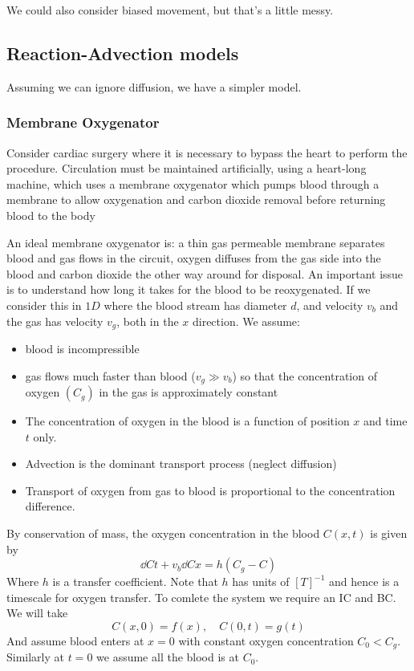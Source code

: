 \documentclass{X:/Documents/Coding/Latex/myassignment}
\begin{document}
We could also consider biased movement, but that's a little messy.

\subsection{Reaction-Advection models}
Assuming we can ignore diffusion, we have a simpler model.
\subsubsection{Membrane Oxygenator}
Consider cardiac surgery where it is necessary to bypass the heart to perform the procedure. Circulation must be maintained artificially, using a heart-long machine, which uses a membrane oxygenator which pumps blood through a membrane to allow oxygenation and carbon dioxide removal before returning blood to the body

An ideal membrane oxygenator is: a thin gas permeable membrane separates blood and gas flows in the circuit, oxygen diffuses from the gas side into the blood and carbon dioxide the other way around for disposal. An important issue is to understand how long it takes for the blood to be reoxygenated. 
If we consider this in $1D$ where the blood stream has diameter $d$, and velocity $v_b$ and the gas has velocity $v_g$, both in the $x$ direction.
We assume:
\begin{itemize}
	\item blood is incompressible
	\item gas flows much faster than blood ($v_g \gg v_b$) so that the concentration of oxygen $(C_g)$ in the gas is approximately constant
	\item The concentration of oxygen in the blood is a function of position $x$ and time $t$ only.
	\item Advection is the dominant transport process (neglect diffusion)
	\item Transport of oxygen from gas to blood is proportional to the concentration difference.
\end{itemize}
By conservation of mass, the oxygen concentration in the blood $C(x,t)$ is given by
\[\dd Ct + v_b \dd Cx = h(C_g - C)\]
Where $h$ is a transfer coefficient. Note that $h$ has units of $[T]^{-1}$ and hence is a timescale for oxygen transfer.
To comlete the system we require an IC and BC. We will take 
\[C(x,0) = f(x), \quad C(0,t) = g(t)\]
And assume blood enters at $x=0$ with constant oxygen concentration $C_0 < C_g$. Similarly at $t=0$ we assume all the blood is at $C_0$.
\end{document}
